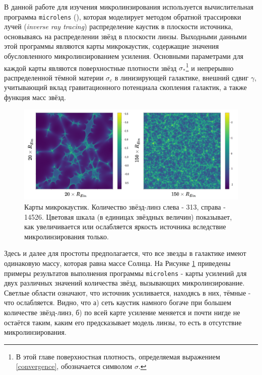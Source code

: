 В данной работе для изучения микролинзирования используется вычислительная программа {\tt{microlens}} (\cite{wambsganss1999}), которая моделирует методом обратной трассировки лучей (\textit{inverse ray tracing}) распределение каустик в плоскости источника, основываясь на распределении звёзд в плоскости линзы. Выходными данными этой программы являются карты микрокаустик, содержащие значения обусловленного микролинзированием усиления. Основными параметрами для каждой карты являются поверхностные плотности звёзд $\sigma_*$\footnote{В этой главе поверхностная плотность, определяемая выражением \eqref{convergence}, обозначается символом $\sigma.$} и непрерывно распределенной тёмной материи $\sigma_c$ в линизирующей галактике, внешний сдвиг $\gamma$, учитывающий вклад гравитационного потенциала скопления галактик, а также функция масс звёзд. 

\begin{figure}[H]
    \centering
	\includegraphics[scale=0.22]{pics/maps_example.png}
	\caption{Карты микрокаустик. Количество звёзд-линз слева - 313, справа - 14526. Цветовая шкала (в единицах звёздных величин) показывает, как увеличивается или ослабляется яркость источника вследствие микролинзирования только. \label{fig:micromaps}} 
\end{figure}
Здесь и далее для простоты предполагается, что все звезды в галактике имеют одинаковую массу, которая равна массе Солнца. На Рисунке \ref{fig:micromaps} приведены примеры результатов выполнения программы {\tt{microlens}} - карты усилений для двух различных значений количества звёзд, вызывающих микролинзирование. Светлые области означают, что источник усиливается, находясь в них, тёмные - что ослабляется. Видно, что а) сеть каустик намного богаче при большем количестве звёзд-линз, б) по всей карте усиление меняется и почти нигде не остаётся таким, каким его предсказывает модель линзы, то есть в отсутствие микролинзирования.